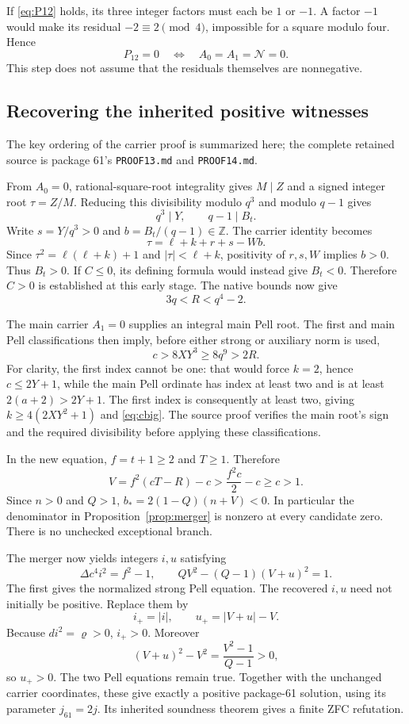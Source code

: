\documentclass[11pt]{article}
\theoremstyle{remark}\newtheorem{remark}[theorem]{Remark}
\newcommand{\Z}{\mathbb Z}\newcommand{\Q}{\mathbb Q}\newcommand{\N}{\mathbb N}\newcommand{\Pos}{\operatorname{Pos}}\newcommand{\Cone}{\mathcal C}\newcommand{\Con}{\operatorname{Con}}
\begin{document}
If \eqref{eq:P12} holds, its three integer factors must each be $1$ or $-1$. A factor $-1$ would make its residual $-2\equiv2\pmod4$, impossible for a square modulo four. Hence
\begin{equation}\label{eq:split}
 P_{12}=0\quad\Longleftrightarrow\quad A_0=A_1=\mathcal N=0.
\end{equation}
This step does not assume that the residuals themselves are nonnegative.

\subsection{Recovering the inherited positive witnesses}

The key ordering of the carrier proof is summarized here; the complete retained source is package 61's \texttt{PROOF13.md} and \texttt{PROOF14.md}.

From $A_0=0$, rational-square-root integrality gives $M\mid Z$ and a signed integer root $\tau=Z/M$. Reducing this divisibility modulo $q^3$ and modulo $q-1$ gives
\[
 q^3\mid Y,\qquad q-1\mid B_t.
\]
Write $s=Y/q^3>0$ and $b=B_t/(q-1)\in\Z$. The carrier identity becomes
\[
 \tau=\ell+k+r+s-Wb.
\]
Since $\tau^2=\ell(\ell+k)+1$ and $|\tau|<\ell+k$, positivity of $r,s,W$ implies $b>0$. Thus $B_t>0$. If $C\le0$, its defining formula would instead give $B_t<0$. Therefore $C>0$ is established at this early stage. The native bounds now give
\[
 3q<R<q^4-2.
\]

The main carrier $A_1=0$ supplies an integral main Pell root. The first and main Pell classifications then imply, before either strong or auxiliary norm is used,
\begin{equation}\label{eq:cbig}
 c>8XY^3\ge8q^9>2R.
\end{equation}
For clarity, the first index cannot be one: that would force $k=2$, hence $c\le2Y+1$, while the main Pell ordinate has index at least two and is at least $2(a+2)>2Y+1$. The first index is consequently at least two, giving $k\ge4(2XY^2+1)$ and \eqref{eq:cbig}. The source proof verifies the main root's sign and the required divisibility before applying these classifications.

In the new equation, $f=t+1\ge2$ and $T\ge1$. Therefore
\[
 V=f^2(cT-R)-c>\frac{f^2c}{2}-c\ge c>1.
\]
Since $n>0$ and $Q>1$, $b_*=2(1-Q)(n+V)<0$. In particular the denominator in Proposition~\ref{prop:merger} is nonzero at every candidate zero. There is no unchecked exceptional branch.

The merger now yields integers $i,u$ satisfying
\[
 \Delta c^4i^2=f^2-1,\qquad
 QV^2-(Q-1)(V+u)^2=1.
\]
The first gives the normalized strong Pell equation. The recovered $i,u$ need not initially be positive. Replace them by
\[
 i_+=|i|,\qquad u_+=|V+u|-V.
\]
Because $di^2=\varrho>0$, $i_+>0$. Moreover
\[
 (V+u)^2-V^2=\frac{V^2-1}{Q-1}>0,
\]
so $u_+>0$. The two Pell equations remain true. Together with the unchanged carrier coordinates, these give exactly a positive package-61 solution, using its parameter $j_{61}=2j$. Its inherited soundness theorem gives a finite ZFC refutation.
\end{document}
